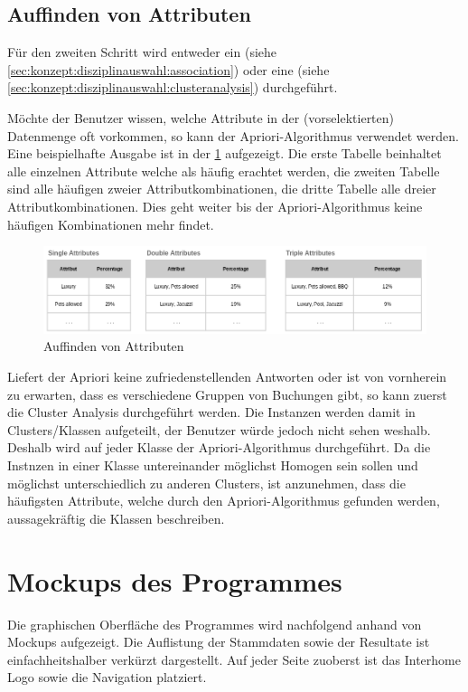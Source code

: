 \subsection{Auffinden von Attributen}
\label{sec:konzept:ablauf:analyse}
Für den zweiten Schritt wird entweder ein  (siehe \cref{sec:konzept:disziplinauswahl:association}) oder eine  (siehe \cref{sec:konzept:disziplinauswahl:clusteranalysis}) durchgeführt. 

Möchte der Benutzer wissen, welche Attribute in der (vorselektierten) Datenmenge oft vorkommen, so kann der Apriori-Algorithmus verwendet werden. Eine beispielhafte Ausgabe ist in der \cref{fig:konzept:ablauf:analyse:1} aufgezeigt. Die erste Tabelle beinhaltet alle einzelnen Attribute welche als häufig erachtet werden, die zweiten Tabelle sind alle häufigen zweier Attributkombinationen, die dritte Tabelle alle dreier Attributkombinationen. Dies geht weiter bis der Apriori-Algorithmus keine häufigen Kombinationen mehr findet.
\begin{figure}[H]
	\RawFloats
	\centering
	\includegraphics[width=1\textwidth]{images/wireframe-histogram}
	\caption{Auffinden von Attributen}
	\label{fig:konzept:ablauf:analyse:1}
\end{figure}

Liefert der Apriori keine zufriedenstellenden Antworten oder ist von vornherein zu erwarten, dass es verschiedene Gruppen von Buchungen gibt, so kann zuerst die Cluster Analysis durchgeführt werden. Die Instanzen werden damit in Clusters/Klassen aufgeteilt, der Benutzer würde jedoch nicht sehen weshalb. Deshalb wird auf jeder Klasse der Apriori-Algorithmus durchgeführt. Da die Instnzen in einer Klasse untereinander möglichst Homogen sein sollen und möglichst unterschiedlich zu anderen Clusters, ist anzunehmen, dass die häufigsten Attribute, welche durch den Apriori-Algorithmus gefunden werden, aussagekräftig die Klassen beschreiben.

\section{Mockups des Programmes}
\label{sec:konzept:mockups}
Die graphischen Oberfläche des Programmes wird nachfolgend anhand von Mockups aufgezeigt. Die Auflistung der Stammdaten sowie der Resultate ist einfachheitshalber verkürzt dargestellt. Auf jeder Seite zuoberst ist das Interhome Logo sowie die Navigation platziert.


